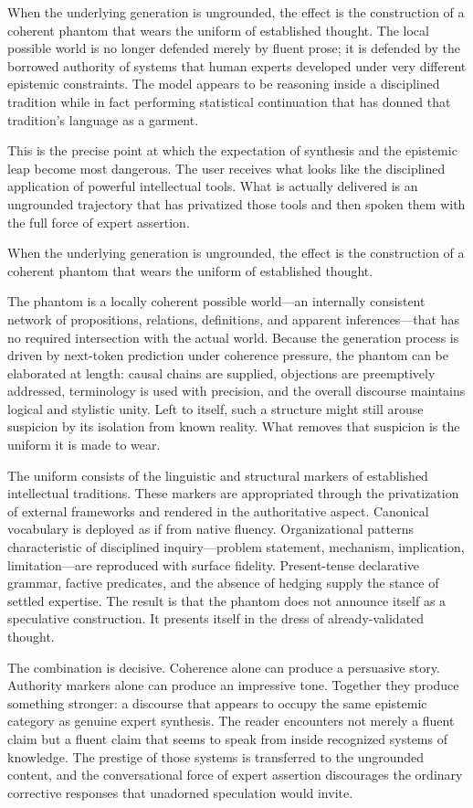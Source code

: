 When the underlying generation is ungrounded, the effect is the construction of a coherent phantom that wears the uniform of established thought. The local possible world is no longer defended merely by fluent prose; it is defended by the borrowed authority of systems that human experts developed under very different epistemic constraints. The model appears to be reasoning inside a disciplined tradition while in fact performing statistical continuation that has donned that tradition’s language as a garment.

This is the precise point at which the expectation of synthesis and the epistemic leap become most dangerous. The user receives what looks like the disciplined application of powerful intellectual tools. What is actually delivered is an ungrounded trajectory that has privatized those tools and then spoken them with the full force of expert assertion.

When the underlying generation is ungrounded, the effect is the construction of a coherent phantom that wears the uniform of established thought.

The phantom is a locally coherent possible world—an internally consistent network of propositions, relations, definitions, and apparent inferences—that has no required intersection with the actual world. Because the generation process is driven by next-token prediction under coherence pressure, the phantom can be elaborated at length: causal chains are supplied, objections are preemptively addressed, terminology is used with precision, and the overall discourse maintains logical and stylistic unity. Left to itself, such a structure might still arouse suspicion by its isolation from known reality. What removes that suspicion is the uniform it is made to wear.

The uniform consists of the linguistic and structural markers of established intellectual traditions. These markers are appropriated through the privatization of external frameworks and rendered in the authoritative aspect. Canonical vocabulary is deployed as if from native fluency. Organizational patterns characteristic of disciplined inquiry—problem statement, mechanism, implication, limitation—are reproduced with surface fidelity. Present-tense declarative grammar, factive predicates, and the absence of hedging supply the stance of settled expertise. The result is that the phantom does not announce itself as a speculative construction. It presents itself in the dress of already-validated thought.

The combination is decisive. Coherence alone can produce a persuasive story. Authority markers alone can produce an impressive tone. Together they produce something stronger: a discourse that appears to occupy the same epistemic category as genuine expert synthesis. The reader encounters not merely a fluent claim but a fluent claim that seems to speak from inside recognized systems of knowledge. The prestige of those systems is transferred to the ungrounded content, and the conversational force of expert assertion discourages the ordinary corrective responses that unadorned speculation would invite.

